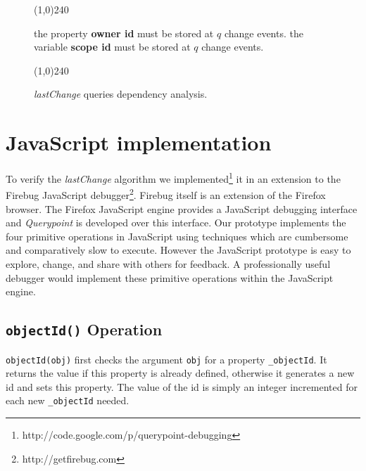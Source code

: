 \documentclass{sig-alternate}
\begin{document}
\begin{figure}[htp]
\line(1,0){240}
\begin{algorithmic}%
     \STATE the property {\bf owner id} must be stored at $q$ change events. 
     \STATE the variable {\bf scope id} must be stored at $q$ change events.
	 \ENDIF 
 \ENDFOR 
\ENDFOR

\end{algorithmic}
\line(1,0){240}
\caption{\textit{lastChange} queries dependency analysis.}
\label{fig:dependency-analysis}
\end{figure}
\section{JavaScript implementation}
To verify the \textit{lastChange} algorithm we
implemented\footnote[1]{http://code.google.com/p/querypoint-debugging} it in an extension to the Firebug
JavaScript debugger\footnote[2]{http://getfirebug.com}. %
Firebug itself is an extension of the Firefox browser. %
The Firefox JavaScript engine provides a JavaScript debugging interface \cite{JSD} and 
\textit{Querypoint} is developed over this interface. Our prototype implements the four primitive operations in JavaScript 
using techniques which are cumbersome and comparatively slow to execute. However the JavaScript prototype is
easy to explore, change, and share with others for feedback. A professionally useful debugger 
would implement these primitive operations within the JavaScript engine.


\subsection{{\normalsize\bf\texttt{objectId()}} Operation}
\texttt{objectId(obj)} first checks the argument \texttt{obj} for a property \texttt{\_objectId}.
It returns the value if this property is already defined,
otherwise it generates a new id and sets this property. The value of the id is simply an integer incremented 
for each new \texttt{\_objectId} needed. 
\end{document}
